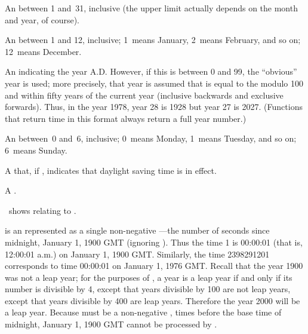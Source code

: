 
An  between 1 and~31, inclusive (the upper limit actually
depends on the month and year, of course).


An  between 1 and 12, inclusive;
1~means January, 2~means February, and so on; 12~means December.


An  indicating the year A.D.  However, if this 
is between 0 and 99, the ``obvious'' year is used; more precisely,
that year is assumed that is equal to the 
 modulo 100 and
within fifty years of the current year (inclusive backwards
and exclusive forwards).  
Thus, in the year 1978, year 28 is 1928
but year 27 is 2027.  (Functions that return time in this format always return
a full year number.) 


An  between~0 and~6, inclusive;
0~means Monday, 1~means Tuesday, and so on; 6~means Sunday.
                      

A  that,
if , indicates that daylight saving time is in effect.
 

A .

\endlist

\Thenextfigure\ shows  relating to .



\endsubsubsection%


 is an   represented as a
single non-negative ---the number of seconds since
midnight, January 1, 1900 GMT (ignoring ).
Thus the time 1 is 00:00:01 (that is, 12:00:01 a.m.) on January 1, 1900 GMT.
Similarly, the time 2398291201 corresponds to time 00:00:01 on January 1,
1976 GMT.
Recall that the year 1900 was not a leap year; for the purposes of
\clisp, a year is a leap year if and only if its number is divisible by 4,
except that years divisible by 100 are not leap years, except that years
divisible by 400 are leap years.  Therefore the year 2000 will
be a leap year.
Because  must be a non-negative ,
times before the base time of midnight, January 1, 1900 GMT cannot be processed by \clisp.

